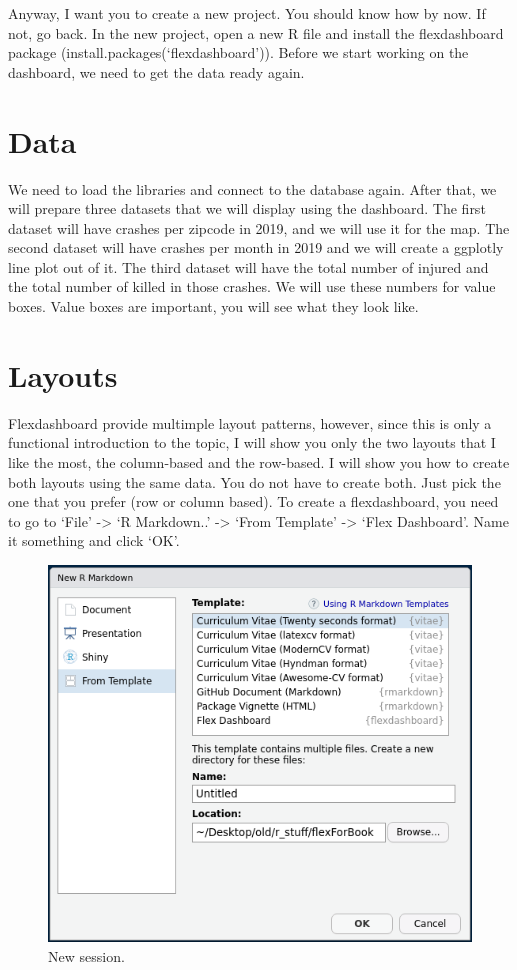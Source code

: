 \documentclass[]{book}
\begin{document}
Anyway, I want you to create a new project. You should know how by now. If not, go back. In the new project, open a new R file and install the flexdashboard package (install.packages(`flexdashboard')). Before we start working on the dashboard, we need to get the data ready again.

\hypertarget{data}{%
\section{Data}\label{data}}

We need to load the libraries and connect to the database again. After that, we will prepare three datasets that we will display using the dashboard. The first dataset will have crashes per zipcode in 2019, and we will use it for the map. The second dataset will have crashes per month in 2019 and we will create a ggplotly line plot out of it. The third dataset will have the total number of injured and the total number of killed in those crashes. We will use these numbers for value boxes. Value boxes are important, you will see what they look like.

\hypertarget{layouts}{%
\section{Layouts}\label{layouts}}

Flexdashboard provide multimple layout patterns, however, since this is only a functional introduction to the topic, I will show you only the two layouts that I like the most, the column-based and the row-based. I will show you how to create both layouts using the same data. You do not have to create both. Just pick the one that you prefer (row or column based). To create a flexdashboard, you need to go to `File' -\textgreater{} `R Markdown..' -\textgreater{} `From Template' -\textgreater{} `Flex Dashboard'. Name it something and click `OK'.

\begin{figure}
\centering
\includegraphics{flex1.png}
\caption{New session.}
\end{figure}
\end{document}
